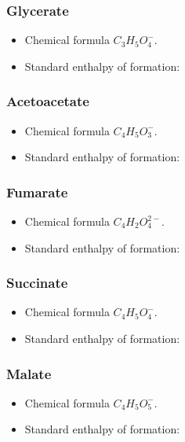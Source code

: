 \documentclass{article}
\begin{document}
\subsubsection{Glycerate}
\begin{itemize}
    \item Chemical formula $C_3H_5O_4^-$.
    \item Standard enthalpy of formation:
\end{itemize}

\subsubsection{Acetoacetate}
\begin{itemize}
    \item Chemical formula $C_4H_5O_3^-$.
    \item Standard enthalpy of formation:
\end{itemize}

\subsubsection{Fumarate}
\begin{itemize}
    \item Chemical formula $C_4H_2O_4^{2-}$.
    \item Standard enthalpy of formation:
\end{itemize}

\subsubsection{Succinate}
\begin{itemize}
    \item Chemical formula $C_4H_5O_4^-$.
    \item Standard enthalpy of formation:
\end{itemize}

\subsubsection{Malate}
\begin{itemize}
    \item Chemical formula $C_4H_5O_5^-$.
    \item Standard enthalpy of formation:
\end{itemize}
\end{document}
